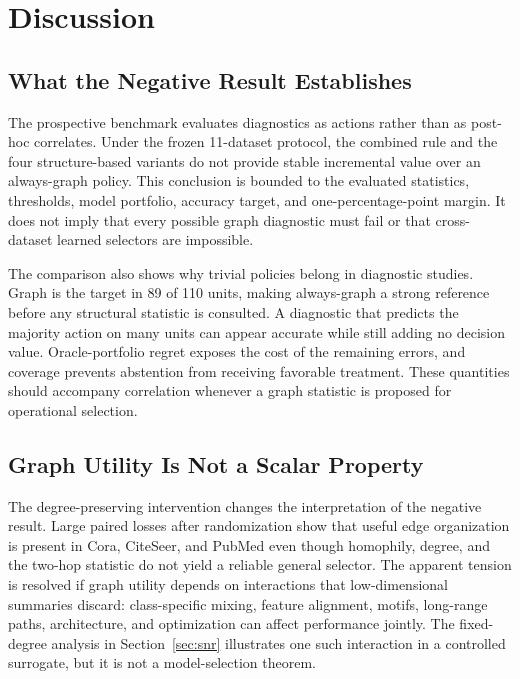 \section{Discussion}
\label{sec:discussion}

\subsection{What the Negative Result Establishes}

The prospective benchmark evaluates diagnostics as actions rather than as post-hoc correlates. Under the frozen 11-dataset protocol, the combined rule and the four structure-based variants do not provide stable incremental value over an always-graph policy. This conclusion is bounded to the evaluated statistics, thresholds, model portfolio, accuracy target, and one-percentage-point margin. It does not imply that every possible graph diagnostic must fail or that cross-dataset learned selectors are impossible.

The comparison also shows why trivial policies belong in diagnostic studies. Graph is the target in 89 of 110 units, making always-graph a strong reference before any structural statistic is consulted. A diagnostic that predicts the majority action on many units can appear accurate while still adding no decision value. Oracle-portfolio regret exposes the cost of the remaining errors, and coverage prevents abstention from receiving favorable treatment. These quantities should accompany correlation whenever a graph statistic is proposed for operational selection.

\subsection{Graph Utility Is Not a Scalar Property}

The degree-preserving intervention changes the interpretation of the negative result. Large paired losses after randomization show that useful edge organization is present in Cora, CiteSeer, and PubMed even though homophily, degree, and the two-hop statistic do not yield a reliable general selector. The apparent tension is resolved if graph utility depends on interactions that low-dimensional summaries discard: class-specific mixing, feature alignment, motifs, long-range paths, architecture, and optimization can affect performance jointly. The fixed-degree analysis in Section~\ref{sec:snr} illustrates one such interaction in a controlled surrogate, but it is not a model-selection theorem.


